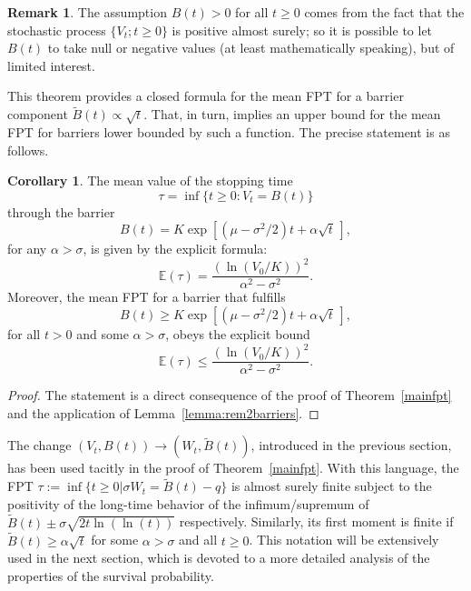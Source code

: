\documentclass[12pt]{article}
\theoremstyle{definition}
\newtheorem{corollary}{Corollary}[theorem]
\newtheorem{remark}{Remark}[theorem]
\begin{document}
\begin{remark}
The assumption $B(t)>0$ for all $t \ge 0$ comes from the fact that the stochastic process $\{V_t; t \ge 0\}$ is positive almost surely; so it is possible to let $B(t)$ to take null or negative values (at least mathematically speaking), but of limited interest. 
\end{remark}

This theorem provides a closed formula for the mean FPT for a barrier component $\tilde{B}(t)\propto \sqrt{t}$. That, in turn, implies an upper bound for the mean FPT for barriers lower bounded by such a function. The precise statement is as follows.

\begin{corollary}
\label{cor:mainfpt}
The mean value of the stopping time
$$
\tau = \inf \{t \ge 0 : V_t = B(t)\}
$$
through the barrier
$$
B(t) = K \exp \left[(\mu-\sigma^2/2)t + \alpha \sqrt{t} \, \right],
$$
for any $\alpha > \sigma$, is given by the explicit formula:
$$
\mathbb{E}(\tau) = \frac{(\ln(V_0/K))^2}{\alpha^2 - \sigma^2}.
$$
Moreover, the mean FPT for a barrier that fulfills
$$
B(t) \ge K \exp \left[(\mu-\sigma^2/2)t + \alpha \sqrt{t} \, \right],
$$
for all $t > 0$ and some $\alpha > \sigma$, obeys the explicit bound
$$
\mathbb{E}(\tau) \le \frac{(\ln(V_0/K))^2}{\alpha^2 - \sigma^2}.
$$
\end{corollary}

\begin{proof}
The statement is a direct consequence of the proof of Theorem~\ref{mainfpt} and the application of Lemma~\ref{lemma:rem2barriers}.
\end{proof}
The change $(V_t,B(t))\rightarrow (W_t,\tilde{B}(t))$, introduced in the previous section, has been used tacitly in the proof of Theorem~\ref{mainfpt}. With this language, the FPT $\tau:=\inf\lbrace t\geq 0\vert \sigma W_t=\tilde{B}(t)-q\rbrace$ is almost surely finite subject to the positivity of the long-time behavior of the infimum/supremum of  $\tilde{B}(t)\pm\sigma\sqrt{2t\ln(\ln(t))}$ respectively. Similarly, its first moment is finite if $\tilde{B}(t) \geq \alpha\sqrt{t}$ for some $\alpha > \sigma$ and all $t\geq0$. This notation will be extensively used in the next section, which is devoted to a more detailed analysis of the properties of the survival probability.
\end{document}

